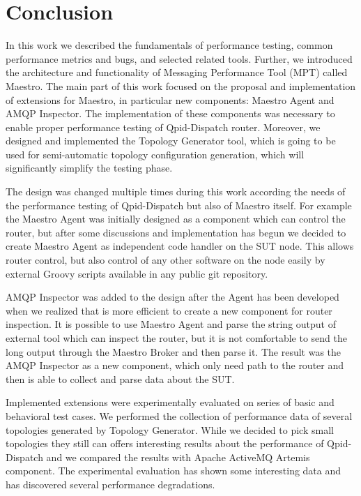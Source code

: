 
\chapter{Conclusion}
\label{Conclusion}
In this work we described the fundamentals of performance testing, common performance metrics and bugs, and selected related tools. Further, we introduced the architecture and functionality of Messaging Performance Tool (MPT) called Maestro. The main part of this work focused on the proposal and implementation of extensions for Maestro, in particular new components: Maestro Agent and AMQP Inspector. The implementation of these components was necessary to enable proper performance testing of Qpid-Dispatch router. Moreover, we designed and implemented the Topology Generator tool, which is going to be used for semi-automatic topology configuration generation, which will significantly simplify the testing phase.

The design was changed multiple times during this work according the needs of the performance testing of Qpid-Dispatch but also of Maestro itself. For example the Maestro Agent was initially designed as a component which can control the router, but after some discussions and implementation has begun we decided to create Maestro Agent as independent code handler on the SUT node. This allows router control, but also control of any other software on the node easily by external Groovy scripts available in any public git repository.

AMQP Inspector was added to the design after the Agent has been developed when we realized that is more efficient to create a new component for router inspection. It is possible to use Maestro Agent and parse the string output of external tool which can inspect the router, but it is not comfortable to send the long output through the Maestro Broker and then parse it. The result was the AMQP Inspector as a new component, which only need path to the router and then is able to collect and parse data about the SUT.

Implemented extensions were experimentally evaluated on series of basic and behavioral test cases. We performed the collection of performance data of several topologies generated by Topology Generator. While we decided to pick small topologies they still can offers interesting results about the performance of Qpid-Dispatch and we compared the results with Apache ActiveMQ Artemis component. The experimental evaluation has shown some interesting data and has discovered several performance degradations.

